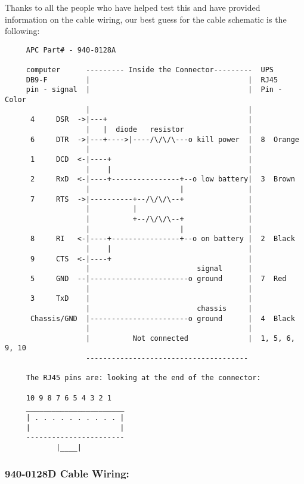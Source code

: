 Thanks to all the people who have helped test this and have provided
information on the cable wiring, our best guess for the cable schematic is the
following: 

\footnotesize
\begin{verbatim}
     APC Part# - 940-0128A

     computer      --------- Inside the Connector---------  UPS
     DB9-F         |                                     |  RJ45
     pin - signal  |                                     |  Pin - Color
                   |                                     |
      4     DSR  ->|---+                                 |
                   |   |  diode   resistor               |
      6     DTR  ->|---+---->|----/\/\/\---o kill power  |  8  Orange
                   |                                     |
      1     DCD  <-|----+                                |
                   |    |                                |
      2     RxD  <-|----+----------------+--o low battery|  3  Brown
                   |                     |               |
      7     RTS  ->|----------+--/\/\/\--+               |
                   |          |                          |
                   |          +--/\/\/\--+               |
                   |                     |               |
      8     RI   <-|----+----------------+--o on battery |  2  Black
                   |    |                                |
      9     CTS  <-|----+                                |
                   |                         signal      |
      5     GND  --|-----------------------o ground      |  7  Red
                   |                                     |
      3     TxD    |                                     |
                   |                         chassis     |
      Chassis/GND  |-----------------------o ground      |  4  Black
                   |                                     |
                   |          Not connected              |  1, 5, 6, 9, 10
                   --------------------------------------
     
     The RJ45 pins are: looking at the end of the connector:
     
     10 9 8 7 6 5 4 3 2 1
     _______________________
     | . . . . . . . . . . |
     |                     |
     -----------------------
            |____|
\end{verbatim}
\normalsize

\subsubsection*{940-0128D Cable Wiring:}

